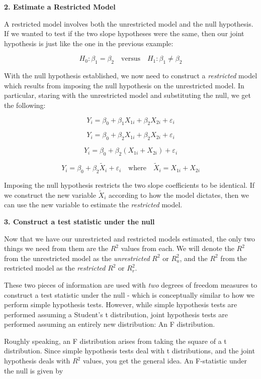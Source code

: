 \documentclass[
]{book}
\begin{document}
\textbf{2. Estimate a Restricted Model}

A restricted model involves both the unrestricted model and the null hypothesis. If we wanted to test if the two slope hypotheses were the same, then our joint hypothesis is just like the one in the previous example:

\[H_0:\beta_1=\beta_2 \quad \text{versus} \quad H_1:\beta_1 \neq \beta_2\]

With the null hypothesis established, we now need to construct a \emph{restricted} model which results from imposing the null hypothesis on the unrestricted model. In particular, staring with the unrestricted model and substituting the null, we get the following:

\[Y_i = \beta_0 + \beta_1 X_{1i} + \beta_2 X_{2i} + \varepsilon_i\]

\[Y_i = \beta_0 + \beta_2 X_{1i} + \beta_2 X_{2i} + \varepsilon_i\]

\[Y_i = \beta_0 + \beta_2 (X_{1i} + X_{2i}) + \varepsilon_i\]

\[Y_i = \beta_0 + \beta_2 \tilde{X}_{i} + \varepsilon_i \quad \text{where} \quad \tilde{X}_{i} = X_{1i} + X_{2i}\]

Imposing the null hypothesis restricts the two slope coefficients to be identical. If we construct the new variable \(\tilde{X}_i\) according to how the model dictates, then we can use the new variable to estimate the \emph{restricted} model.

\textbf{3. Construct a test statistic under the null}

Now that we have our unrestricted and restricted models estimated, the only two things we need from them are the \(R^2\) values from each. We will denote the \(R^2\) from the unrestricted model as the \emph{unrestricted} \(R^2\) or \(R^2_u\), and the \(R^2\) from the restricted model as the \emph{restricted} \(R^2\) or \(R^2_r\).

These two pieces of information are used with \emph{two} degrees of freedom measures to construct a test statistic under the null - which is conceptually similar to how we perform simple hypothesis tests. However, while simple hypothesis tests are performed assuming a Student's t distribution, joint hypothesis tests are performed assuming an entirely new distribution: An F distribution.

Roughly speaking, an F distribution arises from taking the square of a t distribution. Since simple hypothesis tests deal with t distributions, and the joint hypothesis deals with \(R^2\) values, you get the general idea. An F-statistic under the null is given by
\end{document}
